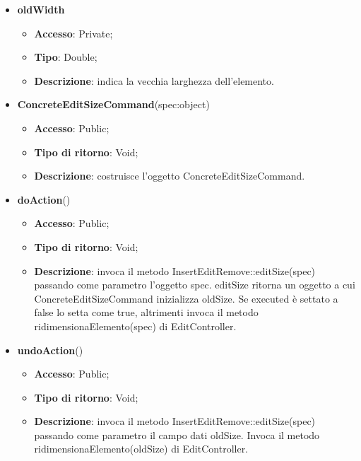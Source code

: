 {{{\begin{itemize}
\begin{itemize}
\begin{itemize}
\begin{itemize}
				\end{itemize}
				\item \textbf{oldWidth}
				\begin{itemize}
					\item \textbf{Accesso}: Private;
					\item \textbf{Tipo}: Double;
					\item \textbf{Descrizione}: indica la vecchia larghezza dell’elemento.
				\end{itemize}
			\end{itemize}
				\end{itemize}
				\end{itemize}
			\begin{itemize}
				\item \textbf{ConcreteEditSizeCommand}(spec:object)
				\begin{itemize}
					\item \textbf{Accesso}: Public;
					\item \textbf{Tipo di ritorno}: Void;
					\item \textbf{Descrizione}: costruisce l’oggetto ConcreteEditSizeCommand.
				\end{itemize}
				\item \textbf{doAction}()
				\begin{itemize}
					\item \textbf{Accesso}: Public;
					\item \textbf{Tipo di ritorno}: Void;
					\item \textbf{Descrizione}: invoca il metodo InsertEditRemove::editSize(spec) passando come parametro l'oggetto spec. editSize ritorna un oggetto a cui ConcreteEditSizeCommand inizializza oldSize. Se executed è settato a false lo setta come true, altrimenti invoca il metodo ridimensionaElemento(spec) di EditController.
				\end{itemize}
				\item \textbf{undoAction}()
				\begin{itemize}
					\item \textbf{Accesso}: Public;
					\item \textbf{Tipo di ritorno}: Void;
					\item \textbf{Descrizione}: invoca il metodo InsertEditRemove::editSize(spec) passando come parametro il campo dati oldSize. Invoca il metodo ridimensionaElemento(oldSize) di EditController.
				\end{itemize}
			\end{itemize}
			}

}}
